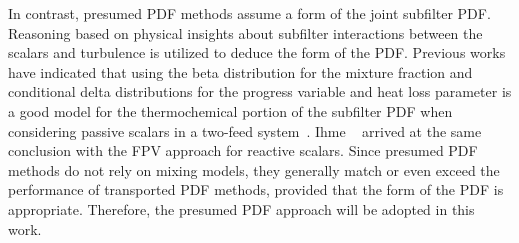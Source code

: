 In contrast, presumed PDF methods assume a form of the joint subfilter PDF. Reasoning based on physical insights about subfilter interactions between the scalars and turbulence is utilized to deduce the form of the PDF. Previous works have indicated that using the beta distribution for the mixture fraction and conditional delta distributions for the progress variable and heat loss parameter is a good model for the thermochemical portion of the subfilter PDF when considering passive scalars in a two-feed system~\cite{cook1994,jimenez1997,wall2000,ihme2008}. Ihme \etal~\cite{ihme2005} arrived at the same conclusion with the FPV approach for reactive scalars. Since presumed PDF methods do not rely on mixing models, they generally match or even exceed the performance of transported PDF methods, provided that the form of the PDF is appropriate. Therefore, the presumed PDF approach will be adopted in this work.

